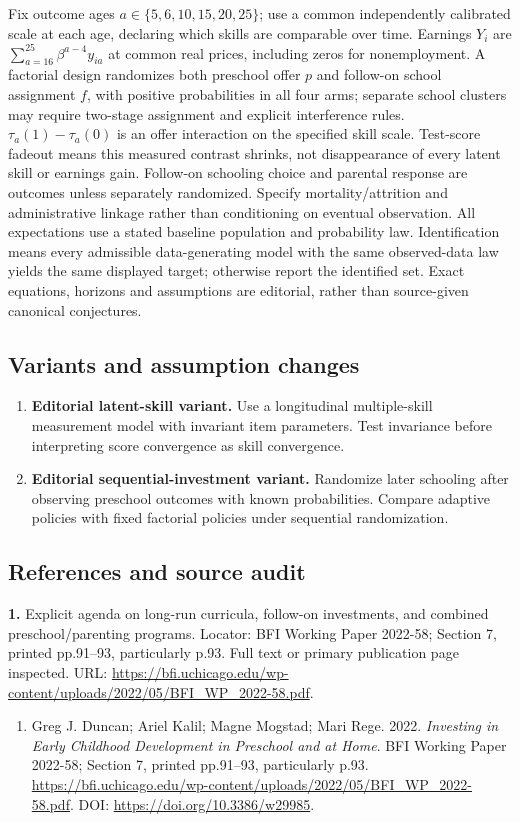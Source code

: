 \documentclass[11pt,a4paper]{article}
\begin{document}
Fix outcome ages \(a\in\{5,6,10,15,20,25\}\); use a common independently calibrated scale at each age, declaring which skills are comparable over time. Earnings \(Y_i\) are \(\sum_{a=16}^{25}\beta^{a-4}y_{ia}\) at common real prices, including zeros for nonemployment. A factorial design randomizes both preschool offer \(p\) and follow-on school assignment \(f\), with positive probabilities in all four arms; separate school clusters may require two-stage assignment and explicit interference rules. \(\tau_a(1)-\tau_a(0)\) is an offer interaction on the specified skill scale. Test-score fadeout means this measured contrast shrinks, not disappearance of every latent skill or earnings gain. Follow-on schooling choice and parental response are outcomes unless separately randomized. Specify mortality/attrition and administrative linkage rather than conditioning on eventual observation. All expectations use a stated baseline population and probability law. Identification means every admissible data-generating model with the same observed-data law yields the same displayed target; otherwise report the identified set. Exact equations, horizons and assumptions are editorial, rather than source-given canonical conjectures.
\subsection*{Variants and assumption changes}
\begin{enumerate}
\item \textbf{Editorial latent-skill variant.} Use a longitudinal multiple-skill measurement model with invariant item parameters. Test invariance before interpreting score convergence as skill convergence.
\item \textbf{Editorial sequential-investment variant.} Randomize later schooling after observing preschool outcomes with known probabilities. Compare adaptive policies with fixed factorial policies under sequential randomization.
\end{enumerate}
\subsection*{References and source audit}
\textbf{1.} Explicit agenda on long-run curricula, follow-on investments, and combined preschool/parenting programs. Locator: BFI Working Paper 2022-58; Section 7, printed pp.91–93, particularly p.93. Full text or primary publication page inspected. URL: \url{https://bfi.uchicago.edu/wp-content/uploads/2022/05/BFI_WP_2022-58.pdf}.
\begin{enumerate}\raggedright
\item\hypertarget{definitions:source:30007732:1}{} Greg J. Duncan; Ariel Kalil; Magne Mogstad; Mari Rege. 2022. \emph{Investing in Early Childhood Development in Preschool and at Home}. BFI Working Paper 2022-58; Section 7, printed pp.91–93, particularly p.93.
\url{https://bfi.uchicago.edu/wp-content/uploads/2022/05/BFI_WP_2022-58.pdf}.
DOI: \url{https://doi.org/10.3386/w29985}.
\end{enumerate}
\end{document}
